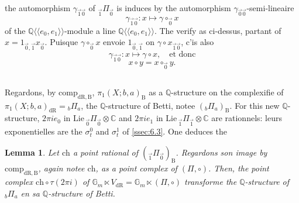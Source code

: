 \documentclass[11pt,a4paper]{article}
\theoremstyle{plain}
\newtheorem{lemma}[theorem]{Lemma}
\theoremstyle{definition}
\newcommand{\Q}{\mathbb{Q}}
\newcommand{\C}{\mathbb{C}}
\newcommand{\Gm}{\mathbb{G}_m}
\newcommand{\dR}{\mathrm{dR}}
\newcommand{\B}{\mathrm{B}}
\newcommand{\comp}{\mathrm{comp}}
\begin{document}
the automorphism $\gamma_{\vec{1}\vec{0}}$ of ${}_{\vec{1}}\Pi_{\vec{0}}$ is induces by the automorphism $\gamma_{\vec{0}\vec{0}}$-semi-lineaire
\begin{equation}\label{eq:7.2.2}
\gamma_{\vec{1}\vec{0}}: x \mapsto \gamma \circ_{\vec{0}} x
\end{equation}
of the $\Q\langle\langle e_0,e_1 \rangle\rangle$-module a line $\Q\langle\langle e_0,e_1 \rangle\rangle$. The verify as ci-dessus, partant of $x = 1_{\vec{0},\vec{1}} x_{\vec{0}}$. Puisque $\gamma \circ_{\vec{0}} x$ envoie $1_{\vec{0},\vec{1}}$ on $\gamma \circ x_{\vec{1}\vec{0}}$, c'is also
\begin{equation}\label{eq:7.2.3}
\gamma_{\vec{1}\vec{0}}: x \mapsto \gamma \circ x, \quad \text{et donc}
\end{equation}
\begin{equation}\label{eq:7.2.4}
x \circ y = x \circ_{\vec{0}} y.
\end{equation}

\subsection{}\label{ssec:7.3}

Regardons, by $\comp_{\dR,\B}$, $\pi_1(X;b,a)_{\B}$ as a $\Q$-structure on the complexifie of $\pi_1(X;b,a)_{\dR} = {}_b\Pi_a$, the $\Q$-structure of Betti, notee $({}_b\Pi_a)_{\B}$. For this new $\Q$-structure, $2\pi i e_0$ in $\mathrm{Lie}\,{}_{\vec{0}}\Pi_{\vec{0}} \otimes \C$ and $2\pi i e_1$ in $\mathrm{Lie}\,{}_{\vec{1}}\Pi_{\vec{1}} \otimes \C$ are rationnels: leurs exponentielles are the $\sigma_t^0$ and $\sigma_t^1$ of \ref{ssec:6.3}. One deduces the

\begin{lemma}\label{lem:7.4}
Let $\mathrm{ch}$ a point rational of $({}_{\vec{1}}\Pi_{\vec{0}})_{\B}$. Regardons son image by $\comp_{\dR,\B}$, again notee $\mathrm{ch}$, as a point complex of $(\Pi, \circ)$. Then, the point complex $\mathrm{ch} \circ \tau(2\pi i)$ of $\Gm \ltimes V_{\dR} = \Gm \ltimes (\Pi, \circ)$ transforme the $\Q$-structure of ${}_b\Pi_a$ en sa $\Q$-structure of Betti.
\end{lemma}

\subsection{}\label{ssec:7.5}
\end{document}
